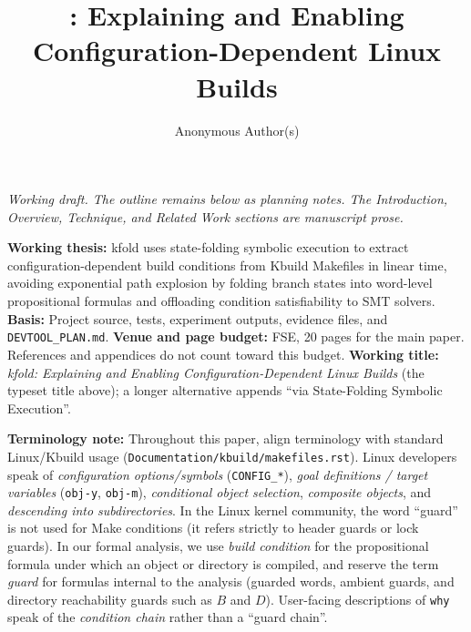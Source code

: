\documentclass[acmsmall]{acmart}
\title{\tool{}: Explaining and Enabling Configuration-Dependent Linux Builds}
\author{Anonymous Author(s)}
\affiliation{\institution{Anonymous Institution}\country{USA}}
\newcommand{\tool}{\textsf{kfold}\xspace}
\begin{document}
\maketitle
\noindent\emph{Working draft. The outline remains below as planning notes. The Introduction, Overview, Technique, and Related Work sections are manuscript prose.}


\textbf{Working thesis:} \tool uses state-folding symbolic execution to extract configuration-dependent build conditions from Kbuild Makefiles in linear time, avoiding exponential path explosion by folding branch states into word-level propositional formulas and offloading condition satisfiability to SMT solvers. \textbf{Basis:} Project source, tests, experiment outputs, evidence files, and \texttt{DEVTOOL\_PLAN.md}. \textbf{Venue and page budget:} FSE, 20 pages for the main paper. References and appendices do not count toward this budget. \textbf{Working title:} \emph{\tool{}: Explaining and Enabling Configuration-Dependent Linux Builds} (the typeset title above); a longer alternative appends ``via State-Folding Symbolic Execution''.

\textbf{Terminology note:} Throughout this paper, align terminology with standard Linux/Kbuild usage (\texttt{Documentation/kbuild/makefiles.rst}). Linux developers speak of \emph{configuration options/symbols} (\texttt{CONFIG\_*}), \emph{goal definitions / target variables} (\texttt{obj-y}, \texttt{obj-m}), \emph{conditional object selection}, \emph{composite objects}, and \emph{descending into subdirectories}. In the Linux kernel community, the word ``guard'' is not used for Make conditions (it refers strictly to header guards or lock guards). In our formal analysis, we use \emph{build condition} for the propositional formula under which an object or directory is compiled, and reserve the term \emph{guard} for formulas internal to the analysis (guarded words, ambient guards, and directory reachability guards such as $B$ and $D$). User-facing descriptions of \texttt{why} speak of the \emph{condition chain} rather than a ``guard chain''.
\end{document}
